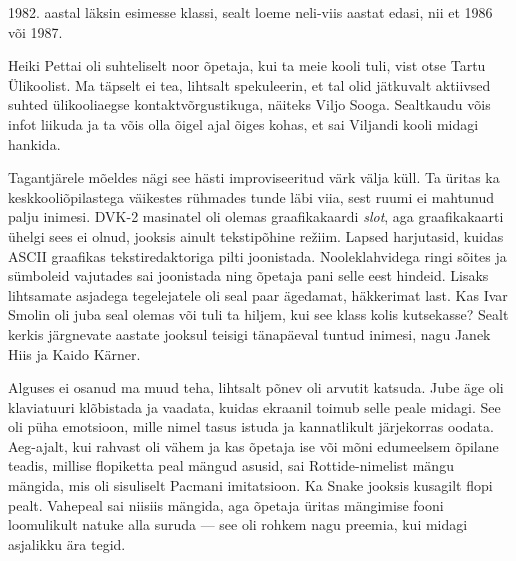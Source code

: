 1982. aastal läksin esimesse klassi, 
sealt loeme neli-viis aastat edasi, nii et 1986 või 1987. 


Heiki Pettai oli suhteliselt noor õpetaja, kui ta 
meie kooli tuli, vist otse Tartu Ülikoolist. Ma täpselt ei tea, lihtsalt 
spekuleerin, et tal olid jätkuvalt aktiivsed suhted ülikooliaegse 
kontaktvõrgustikuga, näiteks Viljo Sooga. Sealtkaudu võis infot liikuda ja ta 
võis olla õigel ajal õiges kohas, et sai Viljandi kooli midagi hankida. 


Tagantjärele mõeldes nägi see hästi improviseeritud värk välja küll. 
Ta üritas ka keskkooliõpilastega väikestes rühmades tunde
läbi viia, sest ruumi ei mahtunud 
palju inimesi. DVK-2 masinatel oli olemas graafikakaardi \emph{slot}, 
aga graafikakaarti ühelgi sees ei olnud, jooksis ainult 
tekstipõhine režiim. Lapsed harjutasid, kuidas 
ASCII graafikas tekstiredaktoriga pilti joonistada. Nooleklahvidega ringi
sõites ja sümboleid vajutades sai joonistada 
ning õpetaja pani selle eest hindeid. Lisaks
lihtsamate asjadega tegelejatele oli seal
paar ägedamat, häkkerimat last. Kas Ivar Smolin oli juba seal olemas või tuli ta hiljem, kui see klass kolis
kutsekasse? Sealt kerkis järgnevate aastate jooksul teisigi tänapäeval tuntud inimesi, 
nagu Janek Hiis ja Kaido 
Kärner.


Alguses ei osanud ma muud teha, lihtsalt põnev oli arvutit 
katsuda. Jube äge oli klaviatuuri klõbistada ja vaadata, kuidas ekraanil toimub selle 
peale midagi. See oli püha emotsioon, mille nimel 
tasus istuda ja kannatlikult järjekorras oodata. Aeg-ajalt, kui rahvast oli vähem ja kas õpetaja ise või mõni 
edumeelsem õpilane teadis, millise flopiketta peal mängud asusid, 
sai Rottide-nimelist mängu mängida, mis oli sisuliselt 
Pacmani imitatsioon. Ka Snake jooksis 
kusagilt flopi pealt. Vahepeal sai niisiis mängida, aga õpetaja üritas 
mängimise fooni loomulikult natuke alla suruda --- see oli rohkem nagu 
preemia, kui midagi asjalikku ära tegid. 

